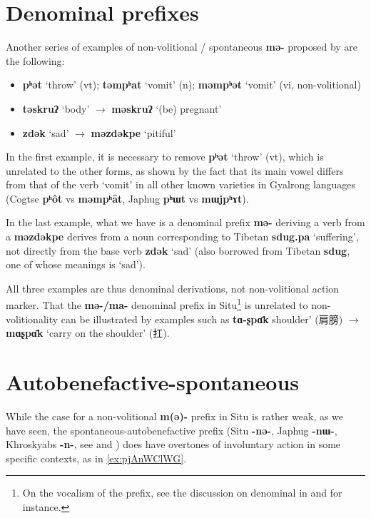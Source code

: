 \documentclass[oneside,a4paper,11pt]{article}
\newcommand{\ipa}[1]{\textbf{{\phon\mbox{#1}}}} %
\newcommand{\zh}[1]{{\cn #1}}
\begin{document}
\section{Denominal prefixes}
Another series of examples of non-volitional / spontaneous \ipa{mə-} proposed by \citet[506]{prins16kyomkyo}  are the following:

\begin{itemize}
\item \ipa{pʰət} `throw' (vt); \ipa{təmpʰat} `vomit' (n); \ipa{məmpʰət} `vomit' (vi, non-volitional)
\item \ipa{təskruʔ} `body' $\rightarrow$ \ipa{məskruʔ} `(be) pregnant'
\item \ipa{zdək} `sad' $\rightarrow$ \ipa{məzdəkpe} `pitiful'
\end{itemize}

In the first example, it is necessary to remove \ipa{pʰət} `throw' (vt), which is unrelated to the other forms, as shown by the fact that its main vowel differs from that of the verb `vomit' in all other known varieties in Gyalrong languages (Cogtse \ipa{pʰôt} vs \ipa{məmpʰāt}, Japhug \ipa{pʰɯt} vs \ipa{mɯjpʰɤt}).

In the last example,  what we have is a denominal prefix \ipa{mə-} deriving a verb from a \ipa{məzdəkpe} derives from a noun corresponding to Tibetan \ipa{sdug.pa} `suffering', not directly from the base verb  \ipa{zdək} `sad' (also borrowed from Tibetan \ipa{sdug}, one of whose meanings is `sad').

All three examples are thus denominal derivations, not non-volitional action marker. That the \ipa{mə-/ma-} denominal prefix in Situ\footnote{On the vocalism of the prefix, see the discussion on denominal in \citealt{jackson98morphology} and \citealt{linxr93jiarong} for instance.} is unrelated to non-volitionality can be illustrated by examples such as \ipa{tɑ-ʂpɑ̄k}  shoulder'  (\zh{肩膀}) $\rightarrow$ \ipa{mɑʂpɑ̄k} `carry on the shoulder' (\zh{扛}).


\section{Autobenefactive-spontaneous}
While the case for a non-volitional \ipa{m(ə)-} prefix in Situ is rather weak, as we have seen, the spontaneous-autobenefactive prefix (Situ \ipa{-nə-}, Japhug \ipa{-nɯ-}, Khroskyabs \ipa{-n-}, see  \citet{jacques16japhug} and  \citet[158-160]{lai13affixale}) does have overtones of involuntary action in some specific contexts, as in \ref{ex:pjAnWClWG}. 
\end{document}
